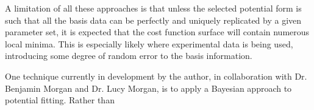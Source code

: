 A limitation of all these approaches is that unless the selected potential form is such that all the basis data can be perfectly and uniquely replicated by a given parameter set, it is expected that the cost function surface will contain numerous local minima.
This is especially likely where experimental data is being used, introducing some degree of random error to the basis information.

One technique currently in development by the author, in collaboration with Dr. Benjamin Morgan and Dr. Lucy Morgan, is to apply a Bayesian approach to potential fitting.
Rather than 
